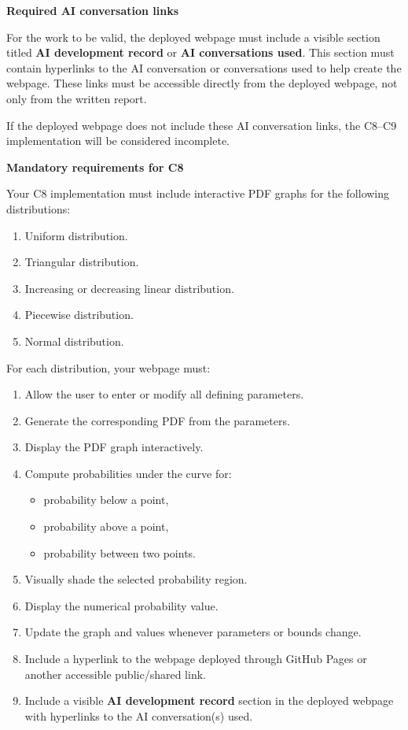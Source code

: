 \documentclass[12pt]{article}
\newcommand{\SubsectionBox}[1]{%
	\noindent\colorbox{gray!30}{%
		\parbox{\linewidth}{\textbf{#1}}%
	}\par\vspace{0.35cm}%
}
\begin{document}
	\vspace{0.35cm}
	
	\SubsectionBox{Required AI conversation links}
	For the work to be valid, the deployed webpage must include a visible section titled \textbf{AI development record} or \textbf{AI conversations used}. This section must contain hyperlinks to the AI conversation or conversations used to help create the webpage. These links must be accessible directly from the deployed webpage, not only from the written report.
	
	If the deployed webpage does not include these AI conversation links, the C8--C9 implementation will be considered incomplete.
	
	\SubsectionBox{Mandatory requirements for C8}
	Your C8 implementation must include interactive PDF graphs for the following distributions:
	\begin{enumerate}
		\item Uniform distribution.
		\item Triangular distribution.
		\item Increasing or decreasing linear distribution.
		\item Piecewise distribution.
		\item Normal distribution.
	\end{enumerate}
	
	For each distribution, your webpage must:
	\begin{enumerate}
		\item Allow the user to enter or modify all defining parameters.
		\item Generate the corresponding PDF from the parameters.
		\item Display the PDF graph interactively.
		\item Compute probabilities under the curve for:
		\begin{itemize}
			\item probability below a point,
			\item probability above a point,
			\item probability between two points.
		\end{itemize}
		\item Visually shade the selected probability region.
		\item Display the numerical probability value.
		\item Update the graph and values whenever parameters or bounds change.
		\item Include a hyperlink to the webpage deployed through GitHub Pages or another accessible public/shared link.
		\item Include a visible \textbf{AI development record} section in the deployed webpage with hyperlinks to the AI conversation(s) used.
	\end{enumerate}
	
\end{document}
